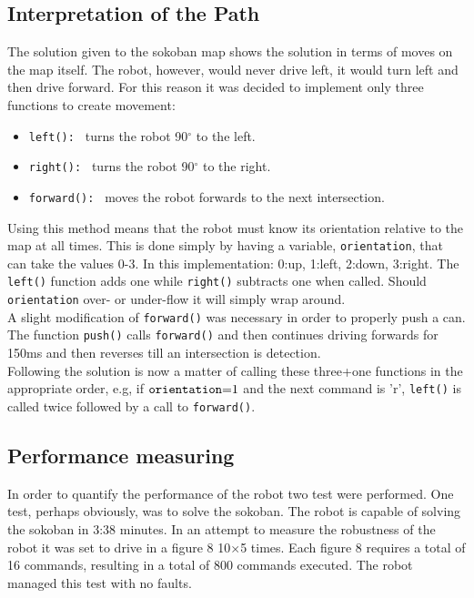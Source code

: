 \subsection{Interpretation of the Path}
The solution given to the sokoban map shows the solution in terms of moves on the map itself.
The robot, however, would never drive left, it would turn left and then drive forward.
For this reason it was decided to implement only three functions to create movement:
\begin{itemize}
	\item \texttt{left(): } turns the robot 90$^\circ$ to the left.
	\item \texttt{right(): } turns the robot 90$^\circ$ to the right.
	\item \texttt{forward(): } moves the robot forwards to the next intersection.
\end{itemize}
Using this method means that the robot must know its orientation relative to the map at all times. 
This is done simply by having a variable, \texttt{orientation}, that can take the values 0-3.
In this implementation: 0:up, 1:left, 2:down, 3:right.
The \texttt{left()} function adds one while \texttt{right()} subtracts one when called.
Should \texttt{orientation} over- or under-flow it will simply wrap around.\\

A slight modification of \texttt{forward()} was necessary in order to properly push a can.
The function \texttt{push()} calls \texttt{forward()} and then continues driving forwards for 150ms and then reverses till an intersection is detection.\\

Following the solution is now a matter of calling these three+one functions in the appropriate order, e.g, if $\text{\texttt{orientation}=1}$ and the next command is 'r', \texttt{left()} is called twice followed by a call to \texttt{forward()}.

\subsection{Performance measuring}
In order to quantify the performance of the robot two test were performed. One test, perhaps obviously, was to solve the sokoban. 
The robot is capable of solving the sokoban in 3:38 minutes. 
In an attempt to measure the robustness of the robot it was set to drive in a figure 8 10$\times$5 times. 
Each figure 8 requires a total of 16 commands, resulting in a total of 800 commands executed.
The robot managed this test with no faults.
